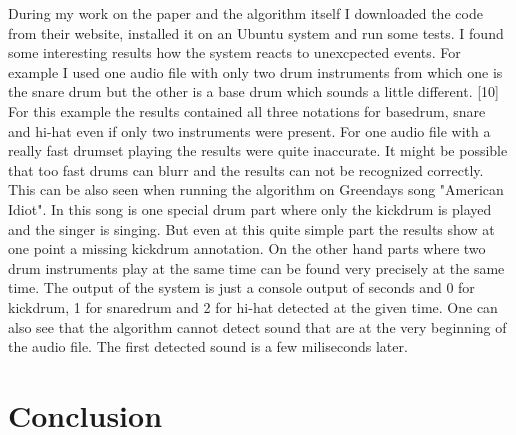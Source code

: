 \documentclass[11pt,twocolumn]{article}
\begin{document}
During my work on the paper and the algorithm itself I downloaded the code from their website, installed it on an Ubuntu system and run some tests. I found some interesting results how the system reacts to unexcpected events. For example I used one audio file with only two drum instruments from which one is the snare drum but the other is a base drum which sounds a little different. [10] For this example the results contained all three notations for basedrum, snare and hi-hat even if only two instruments were present.\newline
For one audio file with a really fast drumset playing the results were quite inaccurate. It might be possible that too fast drums can blurr and the results can not be recognized correctly.\newline
This can be also seen when running the algorithm on Greendays song "American Idiot". In this song is one special drum part where only the kickdrum is played and the singer is singing. But even at this quite simple part the results show at one point a missing kickdrum annotation. On the other hand parts where two drum instruments play at the same time can be found very precisely at the same time.\newline
The output of the system is just a console output of seconds and 0 for kickdrum, 1 for snaredrum and 2 for hi-hat detected at the given time. One can also see that the algorithm cannot detect sound that are at the very beginning of the audio file. The first detected sound is a few miliseconds later.

\section*{Conclusion}
\end{document}
